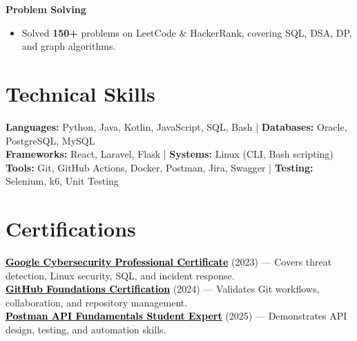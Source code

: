 \documentclass[a4paper,11pt]{article}
\newcommand{\subheading}[1]{\noindent \textbf{#1} \\}
\begin{document}
\vspace{0.5em}

\subheading{Problem Solving}
\begin{itemize}[noitemsep, topsep=0pt]
\item Solved \textbf{150+} problems on LeetCode \& HackerRank, covering SQL, DSA, DP, and graph algorithms.
\end{itemize}




\section{Technical Skills}
\begin{itemize}[leftmargin=0.15in, label={}]
\small{\item{
\textbf{Languages:} Python, Java, Kotlin, JavaScript, SQL, Bash \;|\;
\textbf{Databases:} Oracle, PostgreSQL, MySQL\\
\textbf{Frameworks:} React, Laravel, Flask \;|\;
\textbf{Systems:} Linux (CLI, Bash scripting)\\
\textbf{Tools:} Git, GitHub Actions, Docker, Postman, Jira, Swagger \;|\;
\textbf{Testing:} Selenium, k6, Unit Testing
}}
\end{itemize}




\section{Certifications}
 \begin{itemize}[leftmargin=0.15in, label={}]
    \small{\item{
    \href{https://coursera.org/share/44fd8f381cb39ac45892569cdf6f7674}{\textcolor{black}{\textbf{Google Cybersecurity Professional Certificate}}} (2023) --- Covers threat detection, Linux security, SQL, and incident response. \\
    \href{https://www.credly.com/badges/d5c30c19-02db-4c5f-9bc9-4bd0f4b6a89e/public_url}{\textcolor{black}{\textbf{GitHub Foundations Certification}}} (2024) --- Validates Git workflows, collaboration, and repository management. \\
    \href{https://badges.parchment.com/public/assertions/ZF0yx-i3T1CvXYwDLEUneA?identity__email=sakib.sadman.badhon\%40g.bracu.ac.bd}{\textcolor{black}{\textbf{Postman API Fundamentals Student Expert}}} (2025) --- Demonstrates API design, testing, and automation skills.
    }}
 \end{itemize}


\end{document}
